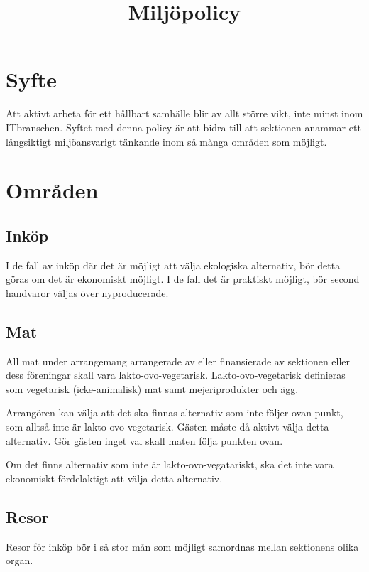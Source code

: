 \documentclass[11pt, includeaddress]{classes/cthit}
\begin{document}
\title{Miljöpolicy}
\maketitle

\thispagestyle{empty}

\newpage

\makeheadfoot%

\setcounter{tocdepth}{2}
\setcounter{page}{1}
\tableofcontents

\newpage

\section{Syfte}
Att aktivt arbeta för ett hållbart samhälle blir av allt större vikt, inte minst inom IT­branschen.
Syftet med denna policy är att bidra till att sektionen anammar ett långsiktigt miljöansvarigt
tänkande inom så många områden som möjligt.


\section{Områden}
\subsection{Inköp}
I de fall av inköp där det är möjligt att välja ekologiska alternativ, bör detta göras om det är
ekonomiskt möjligt.
I de fall det är praktiskt möjligt, bör second hand­varor väljas över nyproducerade.

\subsection{Mat}
All mat under arrangemang arrangerade av eller finansierade av sektionen eller dess föreningar skall vara lakto-ovo-vegetarisk. Lakto-ovo-vegetarisk definieras som vegetarisk (icke-animalisk) mat samt mejeriprodukter och ägg.

Arrangören kan välja att det ska finnas alternativ som inte följer ovan punkt, som alltså inte är lakto-ovo-vegetarisk. Gästen måste då aktivt välja detta alternativ. Gör gästen inget val skall maten följa punkten ovan.

Om det finns alternativ som inte är lakto-ovo-vegatariskt, ska det inte vara ekonomiskt fördelaktigt att välja detta alternativ.

\subsection{Resor}
Resor för inköp bör i så stor mån som möjligt samordnas mellan sektionens olika organ.
\end{document}
